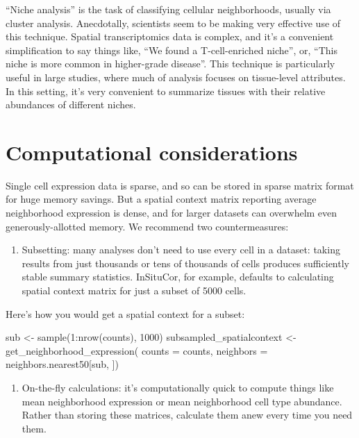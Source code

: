 \documentclass[
  letterpaper,
  DIV=11,
  numbers=noendperiod]{scrartcl}
\newenvironment{Shaded}{\begin{snugshade}}{\end{snugshade}}
\newcommand{\AttributeTok}[1]{\textcolor[rgb]{0.40,0.45,0.13}{#1}}
\newcommand{\DecValTok}[1]{\textcolor[rgb]{0.68,0.00,0.00}{#1}}
\newcommand{\FunctionTok}[1]{\textcolor[rgb]{0.28,0.35,0.67}{#1}}
\newcommand{\NormalTok}[1]{\textcolor[rgb]{0.00,0.23,0.31}{#1}}
\newcommand{\OtherTok}[1]{\textcolor[rgb]{0.00,0.23,0.31}{#1}}
\newcommand{\SpecialCharTok}[1]{\textcolor[rgb]{0.37,0.37,0.37}{#1}}
\providecommand{\tightlist}{%
  \setlength{\itemsep}{0pt}\setlength{\parskip}{0pt}}\usepackage{longtable,booktabs,array}
\begin{document}
``Niche analysis'' is the task of classifying cellular neighborhoods,
usually via cluster analysis. Anecdotally, scientists seem to be making
very effective use of this technique. Spatial transcriptomics data is
complex, and it's a convenient simplification to say things like, ``We
found a T-cell-enriched niche'', or, ``This niche is more common in
higher-grade disease''. This technique is particularly useful in large
studies, where much of analysis focuses on tissue-level attributes. In
this setting, it's very convenient to summarize tissues with their
relative abundances of different niches.

\hypertarget{computational-considerations}{%
\section{Computational
considerations}\label{computational-considerations}}

Single cell expression data is sparse, and so can be stored in sparse
matrix format for huge memory savings. But a spatial context matrix
reporting average neighborhood expression is dense, and for larger
datasets can overwhelm even generously-allotted memory. We recommend two
countermeasures:

\begin{enumerate}
\def\labelenumi{\arabic{enumi}.}
\tightlist
\item
  Subsetting: many analyses don't need to use every cell in a dataset:
  taking results from just thousands or tens of thousands of cells
  produces sufficiently stable summary statistics. InSituCor, for
  example, defaults to calculating spatial context matrix for just a
  subset of 5000 cells.
\end{enumerate}

Here's how you would get a spatial context for a subset:

\begin{Shaded}
\begin{Highlighting}[]
\NormalTok{sub }\OtherTok{\textless{}{-}} \FunctionTok{sample}\NormalTok{(}\DecValTok{1}\SpecialCharTok{:}\FunctionTok{nrow}\NormalTok{(counts), }\DecValTok{1000}\NormalTok{)}
\NormalTok{subsampled\_spatialcontext }\OtherTok{\textless{}{-}} \FunctionTok{get\_neighborhood\_expression}\NormalTok{(}
  \AttributeTok{counts =}\NormalTok{ counts,}
  \AttributeTok{neighbors =}\NormalTok{ neighbors.nearest50[sub, ])}
\end{Highlighting}
\end{Shaded}

\begin{enumerate}
\def\labelenumi{\arabic{enumi}.}
\setcounter{enumi}{1}
\tightlist
\item
  On-the-fly calculations: it's computationally quick to compute things
  like mean neighborhood expression or mean neighborhood cell type
  abundance. Rather than storing these matrices, calculate them anew
  every time you need them.
\end{enumerate}
\end{document}
